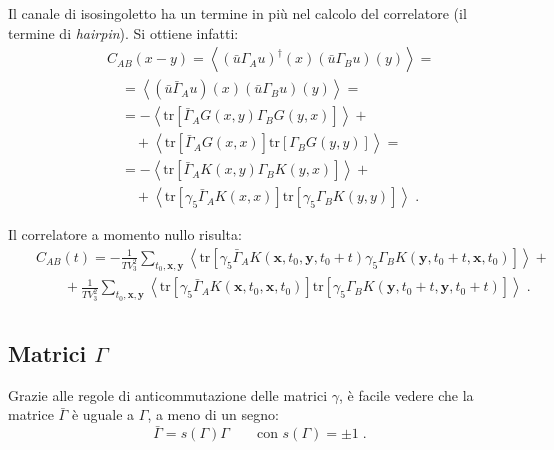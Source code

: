 \documentclass[a4paper]{article}
\newcommand{\tr}{\mathrm{tr}}
\newcommand{\point}{\; .}
\begin{document}
Il canale di isosingoletto ha un termine in pi\`{u} nel calcolo del correlatore (il termine di \textit{hairpin}). Si ottiene infatti:
\begin{eqnarray}
&& C_{AB}(x-y) = \left<
\left( \bar{u} \Gamma_A u \right)^\dagger(x)
\left( \bar{u} \Gamma_B u \right)(y)
\right> = \nonumber \\
&& \quad = \left<
\left( \bar{u} \bar{\Gamma}_A u \right)(x)
\left( \bar{u} \Gamma_B u \right)(y)
\right> = \nonumber \\
&& \quad = - \left< \tr
\left[ \bar{\Gamma}_A G(x,y) \Gamma_B G(y,x) \right]
\right> + \nonumber \\
&& \quad \quad + \left<
\tr \left[ \bar{\Gamma}_A G(x,x) \right] \tr \left[ \Gamma_B G(y,y) \right]
\right> = \nonumber \\
&& \quad = - \left< \tr
\left[ \bar{\Gamma}_A K(x,y) \Gamma_B K(y,x) \right]
\right> + \nonumber \\
&& \quad \quad + \left<
\tr \left[ \gamma_5 \bar{\Gamma}_A K(x,x) \right] \tr \left[ \gamma_5 \Gamma_B K(y,y) \right]
\right> \point
\end{eqnarray}

Il correlatore a momento nullo risulta:
\begin{eqnarray}
&& C_{AB}(t) = - \frac{1}{T V_3^2} \sum_{t_0,\mathbf{x},\mathbf{y}}
\left< \tr
\left[ \gamma_5 \bar{\Gamma}_A K(\mathbf{x},t_0,\mathbf{y},t_0+t) \gamma_5 \Gamma_B K(\mathbf{y},t_0+t,\mathbf{x},t_0) \right]
\right>  + \nonumber \\
&& \quad \quad + \frac{1}{T V_3^2} \sum_{t_0,\mathbf{x},\mathbf{y}}
\left< \tr \left[ \gamma_5 \bar{\Gamma}_A K(\mathbf{x},t_0,\mathbf{x},t_0) \right] \tr \left[ \gamma_5 \Gamma_B K(\mathbf{y},t_0+t,\mathbf{y},t_0+t) \right]
\right> \point \nonumber \\
&&
\end{eqnarray}



\subsection{Matrici $\Gamma$}

Grazie alle regole di anticommutazione delle matrici $\gamma$, \`{e} facile vedere che la matrice $\bar{\Gamma}$ \`{e} uguale a $\Gamma$, a meno di un segno:
\begin{equation} \label{gamma0_adj}
\bar{\Gamma} = s(\Gamma) \Gamma \qquad \textrm{con } s(\Gamma) = \pm 1 \point
\end{equation}
\end{document}
